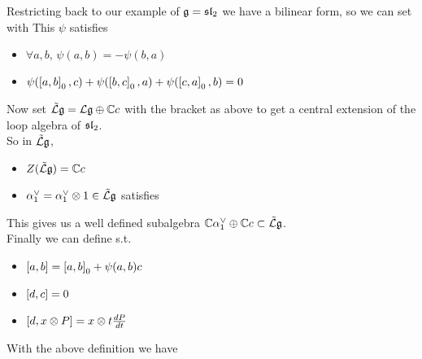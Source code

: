 \documentclass{article}
\begin{document}
Restricting back to our example of $\mf{g} = \mf{sl}_2$ we have a bilinear form, so we can set 
with 
This $\psi$ satisfies 
\begin{itemize}
    \item $\forall a, b, \, \psi(a,b) = - \psi(b,a)$
    \item $\psi(\comm[a]{b}_0,c) + \psi(\comm[b]{c}_0,a) + \psi(\comm[c]{a}_0,b) = 0$
\end{itemize}

Now set $\tilde{\mc{L}}\mf{g} = \mc{L}\mf{g} \oplus \mbb{C}c$ with the bracket as above to get a central extension of the loop algebra of $\mf{sl}_2$. \\
So in $\tilde{\mc{L}}\mf{g}$, 
\begin{itemize}
    \item $Z(\tilde{\mc{L}}\mf{g}) = \mbb{C}c$
    \item $\alpha_1^\vee = \alpha_1^\vee \otimes 1 \in \tilde{\mc{L}}\mf{g}$ satisfies 
\end{itemize}
This gives us a well defined subalgebra $\mbb{C}\alpha_1^\vee \oplus \mbb{C}c \subset \tilde{\mc{L}}\mf{g}$. \\
Finally we can define 
s.t. 
\begin{itemize}
    \item $\comm[a]{b} = \comm[a]{b}_0 + \psi(a,b)c$
    \item $\comm[d]{c} = 0$
    \item $\comm[d]{x \otimes P} = x \otimes t \frac{dP}{dt}$
\end{itemize}

\begin{theorem}
With the above definition we have 
\end{theorem}
\end{document}

